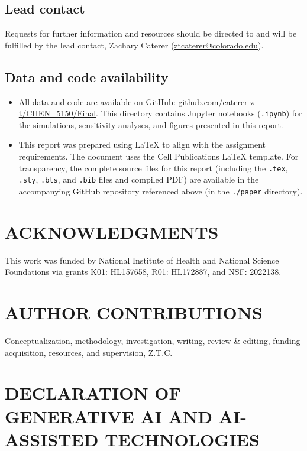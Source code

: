\documentclass[12pt,letterpaper]{article}
\begin{document}
\subsection*{Lead contact}

Requests for further information and resources should be directed to and will be fulfilled by the lead contact, Zachary Caterer (\href{mailto:ztcaterer@colorado.edu}{ztcaterer@colorado.edu}).

\subsection*{Data and code availability}

\begin{itemize}
    \item   All data and code are available on GitHub: \href{https://github.com/caterer-z-t/CHEN_5150/tree/main/Final}{github.com/caterer-z-t/CHEN\_5150/Final}.  This directory contains Jupyter notebooks (\texttt{.ipynb}) for the simulations, sensitivity analyses, and figures presented in this report.

    \item This report was prepared using \LaTeX{} to align with the assignment requirements. The document uses the Cell Publications \LaTeX{} template. For transparency, the complete source files for this report (including the \texttt{.tex}, \texttt{.sty}, \texttt{.bts}, and \texttt{.bib} files and compiled PDF) are available in the accompanying GitHub repository referenced above (in the \texttt{./paper} directory).
    
\end{itemize}

\section*{ACKNOWLEDGMENTS}

This work was funded by National Institute of Health and National Science Foundations via grants K01: HL157658, R01: HL172887, and NSF: 2022138.

\section*{AUTHOR CONTRIBUTIONS}

Conceptualization, methodology, investigation, writing, review \& editing, funding acquisition, resources, and supervision, Z.T.C.

\section*{DECLARATION OF GENERATIVE AI AND AI-ASSISTED TECHNOLOGIES}
\end{document}
